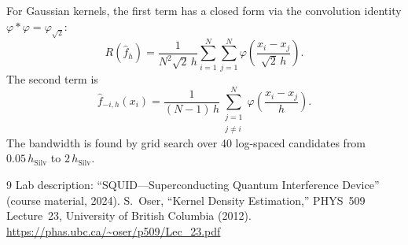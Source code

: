 \documentclass[12pt,a4paper]{article}
\begin{document}
For Gaussian kernels, the first term has a closed form via the convolution
identity $\varphi * \varphi = \varphi_{\sqrt{2}}$:
\begin{equation}
    R(\hat{f}_h) = \frac{1}{N^2 \sqrt{2}\, h}
      \sum_{i=1}^{N}\sum_{j=1}^{N}
      \varphi\!\left(\frac{x_i - x_j}{\sqrt{2}\,h}\right).
    \label{eq:rfhat}
\end{equation}
The second term is
\begin{equation}
    \hat{f}_{-i,h}(x_i) = \frac{1}{(N-1)\,h}
      \sum_{\substack{j=1 \\ j \neq i}}^{N}
      \varphi\!\left(\frac{x_i - x_j}{h}\right).
    \label{eq:loo}
\end{equation}
The bandwidth is found by grid search over 40 log-spaced candidates
from $0.05\,h_{\mathrm{Silv}}$ to $2\,h_{\mathrm{Silv}}$.

\begin{thebibliography}{9}
 Lab description: ``SQUID---Superconducting Quantum
  Interference Device'' (course material, 2024).
 S.~Oser, ``Kernel Density Estimation,''
  PHYS~509 Lecture~23, University of British Columbia (2012).
  \url{https://phas.ubc.ca/~oser/p509/Lec_23.pdf}
\end{thebibliography}
\end{document}
